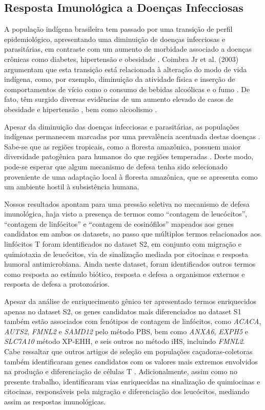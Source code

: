 \subsection{Resposta Imunológica a Doenças Infecciosas}

A população indígena brasileira tem passado por uma transição de perfil epidemiológico, apresentando uma diminuição de doenças infecciosas e parasitárias, em contraste com um aumento de morbidade associado a doenças crônicas como diabetes, hipertensão e obesidade \cite{coimbra_jr_perfil_2001}. Coimbra Jr et al. (2003) argumentam que esta transição está relacionada à alteração do modo de vida indígena, como, por exemplo, diminuição da atividade física e inserção de comportamentos de vício como o consumo de bebidas alcoólicas e o fumo \cite{coimbra_jr_epidemiologia_2003}. De fato, têm surgido diversas evidências de um aumento elevado de casos de obesidade e hipertensão \cite{filho_hypertension_2015}, bem como alcoolismo \cite{ministerio_da_saude_anais_2001}.

Apesar da diminuição das doenças infecciosas e parasitárias, as populações indígenas permanecem marcadas por uma prevalência acentuada destas doenças \cite{carvalho_caracterizacao_2014}. Sabe-se que as regiões tropicais, como a floresta amazônica, possuem maior diversidade patogênica para humanos do que regiões temperadas \cite{guernier_ecology_2004}. Deste modo, pode-se esperar que algum mecanismo de defesa tenha sido selecionado proveniente de uma adaptação local à floresta amazônica, que se apresenta como um ambiente hostil à subsistência humana.

Nossos resultados apontam para uma pressão seletiva no mecanismo de defesa imunológica, haja visto a presença de termos como “contagem de leucócitos”, “contagem de linfócitos” e “contagem de eosinófilos” mapeados aos genes candidatos em ambos os datasets, ao passo que múltiplos termos relacionados aos linfócitos T foram identificados no dataset S2, em conjunto com migração e quimiotaxia de leucócitos, via de sinalização mediada por citocinas e resposta humoral antimicrobiana. Ainda neste dataset, foram identificados outros termos como resposta ao estímulo biótico, resposta e defesa a organismos externos e resposta de defesa a protozoários.

Apesar da análise de enriquecimento gênico ter apresentado termos enriquecidos apenas no dataset S2, os genes candidatos mais diferenciados no dataset S1 também estão associados com fenótipos de contagem de linfócitos, como \textsl{ACACA}, \textsl{AUTS2}, \textsl{FMNL2} e \textsl{SAMD12} pelo método PBS, bem como \textsl{ANXA6}, \textsl{EXPH5} e \textsl{SLC7A10} método XP-EHH, e seis outros no método iHS, incluindo \textsl{FMNL2}. Cabe ressaltar que outros artigos de seleção em populações caçadoras-coletoras também identificaram genes candidatos com os valores mais extremos envolvidos na produção e diferenciação de células T \cite{jarvis_patterns_2012,scheinfeldt_genetic_2012}. Adicionalmente, assim como no presente trabalho,  identificaram vias enriquecidas na sinalização de quimiocinas e citocinas, responsáveis pela migração e diferenciação dos leucócitos, mediando assim as respostas imunológicas.

